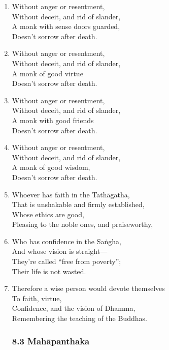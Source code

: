 \documentclass[10pt, openany]{book}
\begin{document}
\begin{enumerate}
\item Without anger or resentment,\\
Without deceit, and rid of slander,\\
A monk with sense doors guarded,\\
Doesn’t sorrow after death.

\item Without anger or resentment,\\
Without deceit, and rid of slander,\\
A monk of good virtue\\
Doesn’t sorrow after death.

\item Without anger or resentment,\\
Without deceit, and rid of slander,\\
A monk with good friends\\
Doesn’t sorrow after death.

\item Without anger or resentment,\\
Without deceit, and rid of slander,\\
A monk of good wisdom,\\
Doesn’t sorrow after death.

\item Whoever has faith in the Tathāgatha,\\
That is unshakable and firmly established,\\
Whose ethics are good,\\
Pleasing to the noble ones, and praiseworthy,

\item Who has confidence in the Saṅgha,\\
And whose vision is straight—\\
They’re called “free from poverty”;\\
Their life is not wasted.

\item Therefore a wise person would devote themselves\\
To faith, virtue, \\
Confidence, and the vision of Dhamma,\\
Remembering the teaching of the Buddhas.

\subsubsection*{8.3 Mahāpanthaka}


\end{enumerate}
\end{document}

